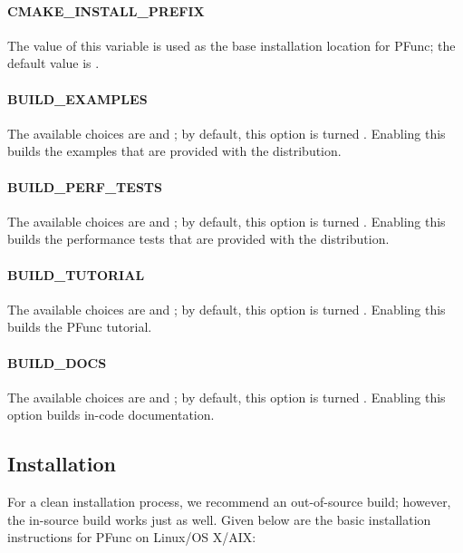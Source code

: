 \paragraph{CMAKE\_INSTALL\_PREFIX}
The value of this variable is used as the base installation location for PFunc;
the default value is .

\paragraph{BUILD\_EXAMPLES}
The available choices are  and ; by default, this 
option is turned . 
%
Enabling this builds the examples that are provided with the distribution.

\paragraph{BUILD\_PERF\_TESTS}
The available choices are  and ; by default, this 
option is turned .
%
Enabling this builds the performance tests that are provided with the
distribution.

\paragraph{BUILD\_TUTORIAL}
The available choices are  and ; by default, this 
option is turned .
%
Enabling this builds the PFunc tutorial.

\paragraph{BUILD\_DOCS}
The available choices are  and ; by default, this 
option is turned .
%
Enabling this option builds in-code documentation. 

\subsection{Installation}
For a clean installation process, we recommend an out-of-source build; however,
the in-source build works just as well. 
%
Given below are the basic installation instructions for PFunc on Linux/OS
X/AIX:

